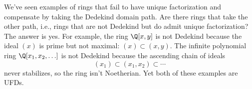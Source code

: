 We've seen examples of rings that fail to have unique factorization and compensate by taking the Dedekind domain path. Are there rings that take the other path, i.e., rings that are not Dedekind but do admit unique factorization? The answer is yes. For example, the ring $\Q[x, y]$ is not Dedekind because the ideal $(x)$ is prime but not maximal: $(x) \subset (x, y)$. The infinite polynomial ring $\Q[x_1, x_2, \ldots]$ is not Dedekind because the ascending chain of ideals
\begin{equation}
    (x_1) \subset (x_1, x_2) \subset \cdots
\end{equation}
never stabilizes, so the ring isn't Noetherian. Yet both of these examples are UFDs.


